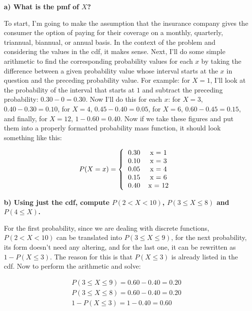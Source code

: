 \documentclass[12pt, letterpaper]{article}
\begin{document}
\textbf{a) What is the pmf of $X$?}

\begin{center}
	To start, I'm going to make the assumption that the insurance company gives the consumer the option of paying for their coverage on a monthly, quarterly, triannual, biannual, or annual basis. In the context of the problem and considering the values in the cdf, it makes sense. Next, I'll do some simple arithmetic to find the corresponding probability values for each $x$ by taking the difference between a given probability value whose interval starts at the $x$ in question and the preceding probability value. For example: for $X=1$, I'll look at the probability of the interval that starts at $1$ and subtract the preceding probability: $0.30 - 0 = 0.30$. Now I'll do this for each $x$: for $X=3$, $0.40 - 0.30 = 0.10$, for $X=4$, $0.45 - 0.40 = 0.05$, for $X=6$, $0.60 - 0.45 = 0.15$, and finally, for $X=12$, $1 - 0.60 = 0.40$. Now if we take these figures and put them into a properly formatted probability mass function, it should look something like this:
\end{center}
\[
	P(X = x)=
	\left\{
		\begin{tabular}{cc}
			$0.30$ & x = 1 \\
			$0.10$ & x = 3 \\
			$0.05$ & x = 4 \\
			$0.15$ & x = 6 \\
			$0.40$ & x = 12 \\
		\end{tabular}
	\right.
\]

\pagebreak

\textbf{b) Using just the cdf, compute $P(2 < X < 10)$, $P(3 \le X \le 8)$ and $P(4 \le X)$.}

\begin{center}
	For the first probability, since we are dealing with discrete functions, $P(2 < X < 10)$ can be translated into $P(3 \le X \le 9)$, for the next probability, its form doesn't need any altering, and for the last one, it can be rewritten as $1 - P(X \le 3)$. The reason for this is that $P(X \le 3)$ is already listed in the cdf. Now to perform the arithmetic and solve:
\end{center}
\begin{align*}
	P(3 \le X \le 9) = 0.60 - 0.40 = \boxed{0.20} \\
	P(3 \le X \le 8) = 0.60 - 0.40 = \boxed{0.20} \\
	1 - P(X \le 3) = 1 - 0.40 = \boxed{0.60}
\end{align*}
\end{document}
